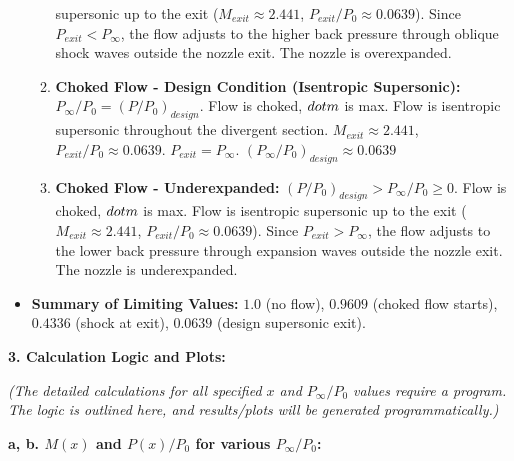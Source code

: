 \begin{itemize}
\begin{enumerate}
    supersonic up to the exit (\(M_{exit} \approx 2.441\),
    \(P_{exit}/P_0 \approx 0.0639\)). Since \(P_{exit} < P_{\infty}\),
    the flow adjusts to the higher back pressure through oblique shock
    waves outside the nozzle exit. The nozzle is overexpanded.
  \item
    \textbf{Choked Flow - Design Condition (Isentropic Supersonic):}
    \(P_{\infty} / P_0 = (P/P_0)_{design}\). Flow is choked,
    \(\\dot{m}\) is max. Flow is isentropic supersonic throughout the
    divergent section. \(M_{exit} \approx 2.441\),
    \(P_{exit}/P_0 \approx 0.0639\). \(P_{exit} = P_{\infty}\).
    \((P_{\infty} / P_0)_{design} \approx 0.0639\)
  \item
    \textbf{Choked Flow - Underexpanded:}
    \((P/P_0)_{design} > P_{\infty} / P_0 \ge 0\). Flow is choked,
    \(\\dot{m}\) is max. Flow is isentropic supersonic up to the exit
    (\(M_{exit} \approx 2.441\), \(P_{exit}/P_0 \approx 0.0639\)). Since
    \(P_{exit} > P_{\infty}\), the flow adjusts to the lower back
    pressure through expansion waves outside the nozzle exit. The nozzle
    is underexpanded.
  \end{enumerate}
\item
  \textbf{Summary of Limiting Values:} \(1.0\) (no flow), \(0.9609\)
  (choked flow starts), \(0.4336\) (shock at exit), \(0.0639\) (design
  supersonic exit).
\end{itemize}

\textbf{3. Calculation Logic and Plots:}

\emph{(The detailed calculations for all specified \(x\) and
\(P_{\infty}/P_0\) values require a program. The logic is outlined here,
and results/plots will be generated programmatically.)}

\textbf{a, b. \(M(x)\) and \(P(x)/P_0\) for various \(P_{\infty}/P_0\):}

